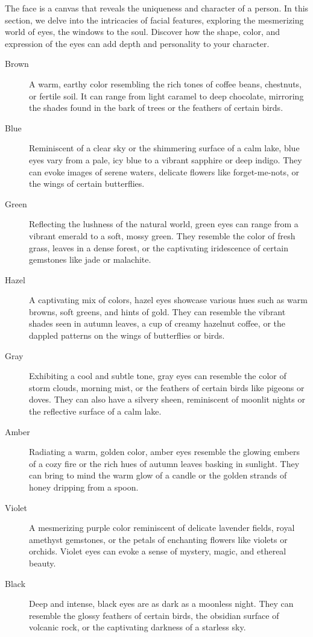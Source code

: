 The face is a canvas that reveals the uniqueness and character of a person. In this section, we delve into the intricacies of facial features, exploring the mesmerizing world of eyes, the windows to the soul. Discover how the shape, color, and expression of the eyes can add depth and personality to your character.

\begin{description}
    \item[Brown] A warm, earthy color resembling the rich tones of coffee beans, chestnuts, or fertile soil. It can range from light caramel to deep chocolate, mirroring the shades found in the bark of trees or the feathers of certain birds.
    \item[Blue] Reminiscent of a clear sky or the shimmering surface of a calm lake, blue eyes vary from a pale, icy blue to a vibrant sapphire or deep indigo. They can evoke images of serene waters, delicate flowers like forget-me-nots, or the wings of certain butterflies.
    \item[Green] Reflecting the lushness of the natural world, green eyes can range from a vibrant emerald to a soft, mossy green. They resemble the color of fresh grass, leaves in a dense forest, or the captivating iridescence of certain gemstones like jade or malachite.
    \item[Hazel] A captivating mix of colors, hazel eyes showcase various hues such as warm browns, soft greens, and hints of gold. They can resemble the vibrant shades seen in autumn leaves, a cup of creamy hazelnut coffee, or the dappled patterns on the wings of butterflies or birds.
    \item[Gray] Exhibiting a cool and subtle tone, gray eyes can resemble the color of storm clouds, morning mist, or the feathers of certain birds like pigeons or doves. They can also have a silvery sheen, reminiscent of moonlit nights or the reflective surface of a calm lake.
    \item[Amber] Radiating a warm, golden color, amber eyes resemble the glowing embers of a cozy fire or the rich hues of autumn leaves basking in sunlight. They can bring to mind the warm glow of a candle or the golden strands of honey dripping from a spoon.
    \item[Violet] A mesmerizing purple color reminiscent of delicate lavender fields, royal amethyst gemstones, or the petals of enchanting flowers like violets or orchids. Violet eyes can evoke a sense of mystery, magic, and ethereal beauty.
    \item[Black] Deep and intense, black eyes are as dark as a moonless night. They can resemble the glossy feathers of certain birds, the obsidian surface of volcanic rock, or the captivating darkness of a starless sky.

\end{description}
